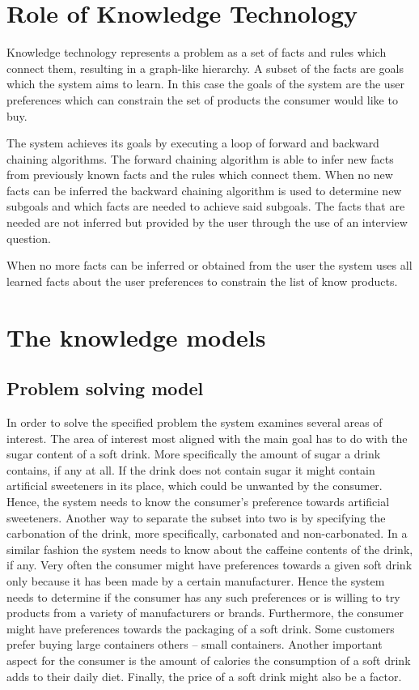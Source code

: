\documentclass[11pt,a4paper]{article}
\begin{document}
\section{Role of Knowledge Technology}

Knowledge technology represents a problem as a set of facts and rules which connect them, resulting in a graph-like hierarchy. A subset of the facts are goals which the system aims to learn. In this case the goals of the system are the user preferences which can constrain the set of products the consumer would like to buy.

The system achieves its goals by executing a loop of forward and backward chaining algorithms. The forward chaining algorithm is able to infer new facts from previously known facts and the rules which connect them. When no new facts can be inferred the backward chaining algorithm is used to determine new subgoals and which facts are needed to achieve said subgoals. The facts that are needed are not inferred but provided by the user through the use of an interview question.

When no more facts can be inferred or obtained from the user the system uses all learned facts about the user preferences to constrain the list of know products.

\section{The knowledge models}

\subsection{Problem solving model}

In order to solve the specified problem the system examines several areas of interest. The area of interest most aligned with the main goal has to do with the sugar content of a soft drink. More specifically the amount of sugar a drink contains, if any at all. If the drink does not contain sugar it might contain artificial sweeteners in its place, which could be unwanted by the consumer. Hence, the system needs to know the consumer's preference towards artificial sweeteners. Another way to separate the subset into two is by specifying the carbonation of the drink, more specifically, carbonated and non-carbonated. In a similar fashion the system needs to know about the caffeine contents of the drink, if any. Very often the consumer might have preferences towards a given soft drink only because it has been made by a certain manufacturer. Hence the system needs to determine if the consumer has any such preferences or is willing to try products from a variety of manufacturers or brands. Furthermore, the consumer might have preferences towards the packaging of a soft drink. Some customers prefer buying large containers others -- small containers. Another important aspect for the consumer is the amount of calories the consumption of a soft drink adds to their daily diet. Finally, the price of a soft drink might also be a factor.  
\end{document}
